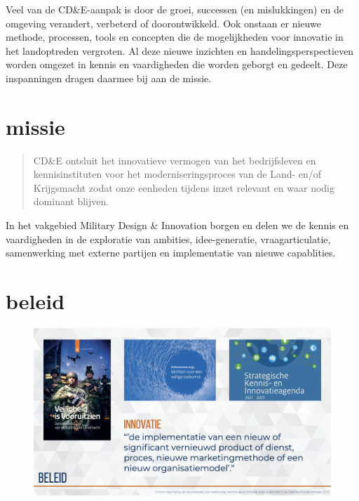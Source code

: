 \documentclass[
]{book}
\begin{document}
Veel van de CD\&E-aanpak is door de groei, successen (en mislukkingen) en de omgeving verandert, verbeterd of doorontwikkeld. Ook onstaan er nieuwe methode, processen, tools en concepten die de mogelijkheden voor innovatie in het landoptreden vergroten. Al deze nieuwe inzichten en handelingsperspectieven worden omgezet in kennis en vaardigheden die worden geborgt en gedeelt. Deze inspanningen dragen daarmee bij aan de missie.

\hypertarget{missie}{%
\section{missie}\label{missie}}

\begin{quote}
CD\&E ontsluit het innovatieve vermogen van het bedrijfsleven en kennisinstituten voor het moderniseringsproces van de Land- en/of Krijgsmacht zodat onze eenheden tijdens inzet relevant en waar nodig dominant blijven.
\end{quote}

In het vakgebied Military Design \& Innovation borgen en delen we de kennis en vaardigheden in de exploratie van ambities, idee-generatie, vraagarticulatie, samenwerking met externe partijen en implementatie van nieuwe capablities.

\hypertarget{beleid}{%
\section{beleid}\label{beleid}}

\begin{figure}
\includegraphics[width=26.67in]{data/keynote-slides/20200430-CDE-Designprocess/20200430-CDE-Designprocess.005} \caption{ }\label{fig:unnamed-chunk-3}
\end{figure}
\end{document}
